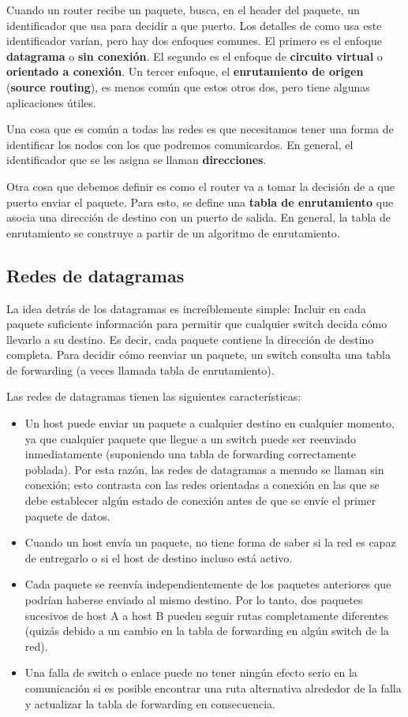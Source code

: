 Cuando un router recibe un paquete, busca, en el header del paquete, un identificador que usa para decidir a que puerto. Los detalles de como usa este identificador varían, pero hay dos enfoques comunes. El primero es el enfoque \textbf{datagrama} o \textbf{sin conexión}. El segundo es el enfoque de \textbf{circuito virtual} o \textbf{orientado a conexión}. Un tercer enfoque, el \textbf{enrutamiento de origen} (\textbf{source routing}), es menos común que estos otros dos, pero tiene algunas aplicaciones útiles.

Una cosa que es común a todas las redes es que necesitamos tener una forma de identificar los nodos con los que podremos comunicardos. En general, el identificador que se les asigna se llaman \textbf{direcciones}.

Otra cosa que debemos definir es como el router va a tomar la decisión de a que puerto enviar el paquete. Para esto, se define una \textbf{tabla de enrutamiento} que asocia una dirección de destino con un puerto de salida. En general, la tabla de enrutamiento se construye a partir de un algoritmo de enrutamiento.

\subsection{Redes de datagramas}
La idea detrás de los datagramas es increíblemente simple: Incluir en cada paquete suficiente información para permitir que cualquier switch decida cómo llevarlo a su destino. Es decir, cada paquete contiene la dirección de destino completa. Para decidir cómo reenviar un paquete, un switch consulta una tabla de forwarding (a veces llamada tabla de enrutamiento).

Las redes de datagramas tienen las siguientes características:
\begin{itemize}
  \item Un host puede enviar un paquete a cualquier destino en cualquier momento, ya que cualquier paquete que llegue a un switch puede ser reenviado inmediatamente (suponiendo una tabla de forwarding correctamente poblada). Por esta razón, las redes de datagramas a menudo se llaman sin conexión; esto contrasta con las redes orientadas a conexión en las que se debe establecer algún estado de conexión antes de que se envíe el primer paquete de datos.
  \item Cuando un host envía un paquete, no tiene forma de saber si la red es capaz de entregarlo o si el host de destino incluso está activo.
  \item Cada paquete se reenvía independientemente de los paquetes anteriores que podrían haberse enviado al mismo destino. Por lo tanto, dos paquetes sucesivos de host A a host B pueden seguir rutas completamente diferentes (quizás debido a un cambio en la tabla de forwarding en algún switch de la red).
  \item Una falla de switch o enlace puede no tener ningún efecto serio en la comunicación si es posible encontrar una ruta alternativa alrededor de la falla y actualizar la tabla de forwarding en consecuencia.
 \end{itemize}

